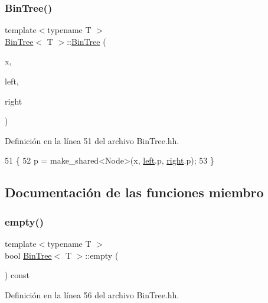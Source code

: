 \subsubsection{\texorpdfstring{Bin\+Tree()}{BinTree()}\hspace{0.1cm}{\footnotesize\ttfamily [3/3]}}
{\footnotesize\ttfamily template$<$typename T $>$ \\
\mbox{\hyperlink{class_bin_tree}{Bin\+Tree}}$<$ T $>$\+::\mbox{\hyperlink{class_bin_tree}{Bin\+Tree}} (\begin{DoxyParamCaption}\item[{const T \&}]{x,  }\item[{const \mbox{\hyperlink{class_bin_tree}{Bin\+Tree}}$<$ T $>$ \&}]{left,  }\item[{const \mbox{\hyperlink{class_bin_tree}{Bin\+Tree}}$<$ T $>$ \&}]{right }\end{DoxyParamCaption})}



Definición en la línea 51 del archivo Bin\+Tree.\+hh.


\begin{DoxyCode}
51                                                                     \{
52         p = make\_shared<Node>(x, \mbox{\hyperlink{class_bin_tree_a82108db4c1b08d1f111027788c196d4e}{left}}.p, \mbox{\hyperlink{class_bin_tree_aff8e96651b27284c329667b5ad3e4d0b}{right}}.p);
53     \}
\end{DoxyCode}


\subsection{Documentación de las funciones miembro}
\mbox{\label{class_bin_tree_a74cda259ba5c25b8ee38ed4dc33e4fad}} 
\subsubsection{\texorpdfstring{empty()}{empty()}}
{\footnotesize\ttfamily template$<$typename T $>$ \\
bool \mbox{\hyperlink{class_bin_tree}{Bin\+Tree}}$<$ T $>$\+::empty (\begin{DoxyParamCaption}{ }\end{DoxyParamCaption}) const}



Definición en la línea 56 del archivo Bin\+Tree.\+hh.


